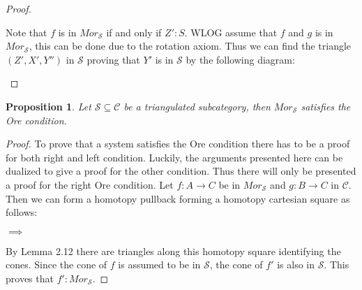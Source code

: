\documentclass[12pt]{article}
\newtheorem{prop}[theorem]{Proposition}
\theoremstyle{definition}
\theoremstyle{remark}
\begin{document}
\begin{proof}
\begin{center}
                \end{center}
                Note that $f$ is in $Mor_\mathcal{S}$ if and only if $Z' : S$. WLOG assume that $f$ and $g$ is in $Mor_\mathcal{S}$, this can be done due to the rotation axiom. Thus we can find the triangle $(Z',X',Y'')$ in $\mathcal{S}$ proving that $Y'$ is in $\mathcal{S}$ by the following diagram:
                \begin{center}
                \end{center}
            \end{proof}

            \begin{prop}
                Let $\mathcal{S}\subseteq\mathcal{C}$ be a triangulated subcategory, then $Mor_\mathcal{S}$ satisfies the Ore condition.
            \end{prop}

            \begin{proof}
                To prove that a system satisfies the Ore condition there has to be a proof for both right and left condition. Luckily, the arguments presented here can be dualized to give a proof for the other condition. Thus there will only be presented a proof for the right Ore condition.
                Let $f:A\rightarrow C$ be in $Mor_\mathcal{S}$ and $g:B\rightarrow C$ in $\mathcal{C}$. Then we can form a homotopy pullback forming a homotopy cartesian square as follows:
                \begin{center}
                    $\implies$
                \end{center}
                By Lemma 2.12 there are triangles along this homotopy square identifying the cones. Since the cone of $f$ is assumed to be in $\mathcal{S}$, the cone of $f'$ is also in $\mathcal{S}$. This proves that $f':Mor_\mathcal{S}$.
            \end{proof}
\end{document}

